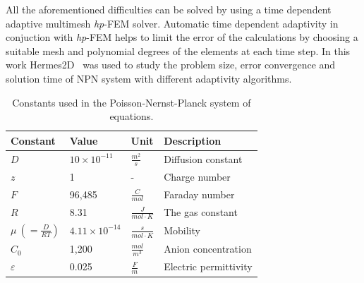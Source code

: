 All the aforementioned difficulties can be solved by using
a time dependent adaptive multimesh \emph{hp}-FEM solver.
Automatic time dependent adaptivity in conjuction with \emph{hp}-FEM 
helps to limit the error of the calculations by choosing
a suitable mesh and polynomial degrees of the elements at each time step.
In this work Hermes2D~\cite{Hermes-project} was used to study
the problem size, error convergence and solution time of NPN system 
with different adaptivity algorithms.

\begin{table}
\caption{Constants used in the Poisson-Nernst-Planck system of equations.}
\centering
\label{Table:used-constants}
{
\begin{tabular}{llll}
  \hline \hline
  Constant&Value&Unit&Description\\
  \hline
  $D$&$10\times10^{-11}$&$\frac{m^2}{s}$&Diffusion constant\\
  $z$&1&-&Charge number\\
  $F$&96,485&$\frac{C}{mol}$&Faraday number\\
  $R$&8.31&$\frac{J}{mol\cdot K}$&The gas constant\\
  $\mu\ \left( = \frac{D}{RT}\right)$&$4.11\times 10^{-14}$&$\frac{s}{mol\cdot K}$&Mobility\\
  $C_{0}$&1,200&$\frac{mol}{m^3}$&Anion concentration\\
  $\varepsilon$&0.025&$\frac{F}{m}$&Electric permittivity\\
  \hline
  \hline
\end{tabular}
}
\end{table}


